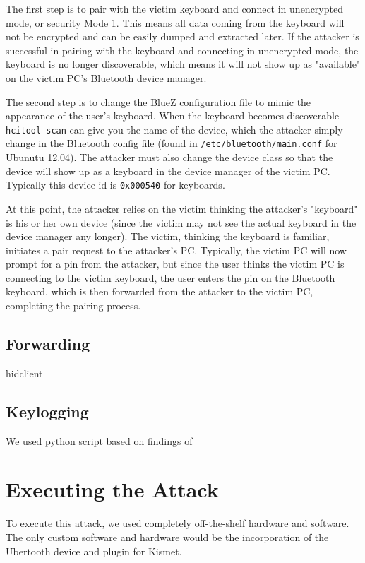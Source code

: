 \documentclass{acm_proc_article-sp}
\begin{document}
The first step is to pair with the victim keyboard and connect in unencrypted mode, or security Mode 1. This means all data coming from the keyboard will not be encrypted and can be easily dumped and extracted later. If the attacker is successful in pairing with the keyboard and connecting in unencrypted mode, the keyboard is no longer discoverable, which means it will not show up as "available" on the victim PC's Bluetooth device manager. 

The second step is to change the BlueZ configuration file to mimic the appearance of the user's keyboard. When the keyboard becomes discoverable \texttt{hcitool scan} can give you the name of the device, which the attacker simply change in the Bluetooth config file (found in \texttt{/etc/bluetooth/main.conf} for Ubunutu 12.04). The attacker must also change the device class so that the device will show up as a keyboard in the device manager of the victim PC. Typically this device id is \texttt{0x000540} for keyboards. 

At this point, the attacker relies on the victim thinking the attacker's "keyboard" is his or her own device (since the victim may not see the actual keyboard in the device manager any longer). The victim, thinking the keyboard is familiar, initiates a pair request to the attacker's PC. Typically, the victim PC will now prompt for a pin from the attacker, but since the user thinks the victim PC is connecting to the victim keyboard, the user enters the pin on the Bluetooth keyboard, which is then forwarded from the attacker to the victim PC, completing the pairing process. 

\subsection{Forwarding}
hidclient \cite{hidclient}
\subsection{Keylogging}
We used python script based on findings of \cite{chopper}


\section{Executing the Attack}
To execute this attack, we used completely off-the-shelf hardware and software. The only custom software and hardware would be the incorporation of the Ubertooth device and plugin for Kismet. 
\end{document}
